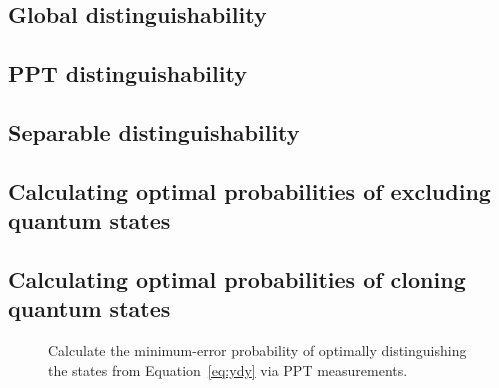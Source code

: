 \documentclass[nofootinbib,superscriptaddress,a4paper,twocolumn,longbibliography,floatfix,pra]{revtex4-2}
\begin{document}
\subsection{Global distinguishability}\label{sec:global}

\subsection{PPT distinguishability}\label{sec:ppt}

\subsection{Separable distinguishability}\label{sec:separable}

\subsection{Calculating optimal probabilities of excluding quantum states}\label{sec:opt_exclude}

\subsection{Calculating optimal probabilities of cloning quantum states}\label{sec:opt_clone}

\begin{figure}[!htpb]
    \centering
            
    \caption{Calculate the minimum-error probability of optimally
    distinguishing the states from Equation~\eqref{eq:ydy} via PPT
    measurements.}
    \label{fig:ppt_ydy}
\end{figure}


\end{document}
